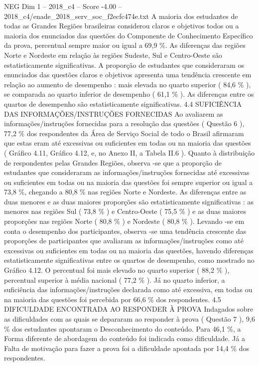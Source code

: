\begin{textsample}{NEG Dim 1 – 2018\_c4 – Score -4.00 – 2018\_c4/enade\_2018\_serv\_soc\_f2ecfc474e.txt}
A maioria dos estudantes de todas as Grandes Regiões brasileiras considerou claros e objetivos todos ou a maioria dos enunciados das questões do Componente de Conhecimento Específico da prova, percentual sempre maior ou igual a 69,9 \%.
As diferenças das regiões Norte e Nordeste em relação às regiões Sudeste, Sul e Centro-Oeste são estatisticamente significativas.
A proporção de estudantes que consideraram os enunciados das questões claros e objetivos apresenta uma tendência crescente em relação ao aumento de desempenho : mais elevada no quarto superior ( 84,6 \% ), se comparada ao quarto inferior de desempenho ( 61,1 \% ).
As diferenças entre os quartos de desempenho são estatisticamente significativas. 4.4 SUFICIÊNCIA DAS INFORMAÇÕES/INSTRUÇÕES FORNECIDAS Ao avaliarem as informações/instruções fornecidas para a resolução das questões ( Questão 6 ), 77,2 \% dos respondentes da Área de Serviço Social de todo o Brasil afirmaram que estas eram até excessivas ou suficientes em todas ou na maioria das questões ( Gráfico 4.11, Gráfico 4.12, e, no Anexo II, a Tabela II.6 ).
Quanto à distribuição de respondentes pelas Grandes Regiões, observa -se que a proporção de estudantes que consideraram as informações/instruções fornecidas até excessivas ou suficientes em todas ou na maioria das questões foi sempre superior ou igual a 73,8 \%, chegando a 80,8 \% nas regiões Norte e Nordeste.
As diferenças entre as duas menores e as duas maiores proporções são estatisticamente significativas : as menores nas regiões Sul ( 73,8 \% ) e Centro-Oeste ( 75,5 \% ) e as duas maiores proporções nas regiões Norte ( 80,8 \% ) e Nordeste ( 80,8 \% ).
Levando -se em conta o desempenho dos participantes, observa -se uma tendência crescente das proporções de participantes que avaliaram as informações/instruções como até excessivas ou suficientes em todas ou na maioria das questões, havendo diferenças estatisticamente significativas entre os quartos de desempenho, como mostrado no Gráfico 4.12.
O percentual foi mais elevado no quarto superior ( 88,2 \% ), percentual superior à média nacional ( 77,2 \% ).
Já no quarto inferior, a suficiência das informações/instruções declarada como até excessiva, em todas ou na maioria das questões foi percebida por 66,6 \% dos respondentes. 4.5 DIFICULDADE ENCONTRADA AO RESPONDER À PROVA Indagados sobre as dificuldades com as quais se depararam ao responder à prova ( Questão 7 ), 9,6 \% dos estudantes apontaram o Desconhecimento do conteúdo.
Para 46,1 \%, a Forma diferente de abordagem do conteúdo foi indicada como dificuldade.
Já a Falta de motivação para fazer a prova foi a dificuldade apontada por 14,4 \% dos respondentes.

\end{textsample}
